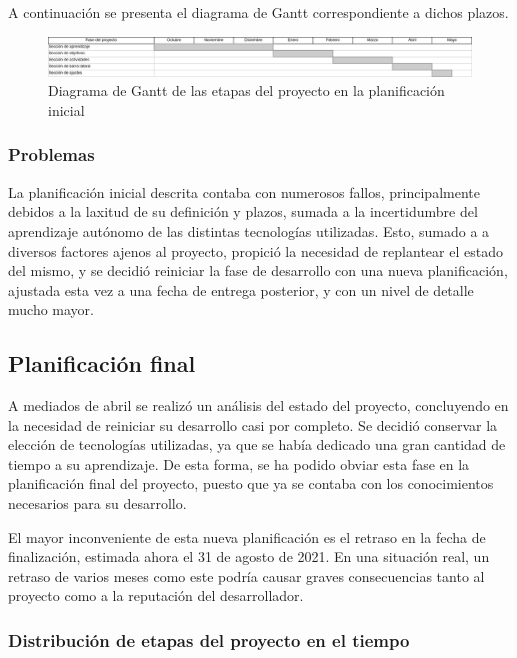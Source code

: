 \documentclass[10pt, a4paper]{aqademic}
\begin{document}
\medskip

A continuación se presenta el diagrama de Gantt correspondiente a dichos plazos. 

\begin{figure}[h]
	\centering
	\includegraphics[scale=0.35]{img/old_Gantt.png}
	\caption{Diagrama de Gantt de las etapas del proyecto en la planificación inicial}
\end{figure}

\subsubsection{Problemas}

La planificación inicial descrita contaba con numerosos fallos, principalmente debidos a la laxitud de su definición y plazos, sumada a la incertidumbre del aprendizaje autónomo de las distintas tecnologías utilizadas. Esto, sumado a a diversos factores ajenos al proyecto, propició la necesidad de replantear el estado del mismo, y se decidió reiniciar la fase de desarrollo con una nueva planificación, ajustada esta vez a una fecha de entrega posterior, y con un nivel de detalle mucho mayor.

\subsection{Planificación final}

A mediados de abril se realizó un análisis del estado del proyecto, concluyendo en la necesidad de reiniciar su desarrollo casi por completo. Se decidió conservar la elección de tecnologías utilizadas, ya que se había dedicado una gran cantidad de tiempo a su aprendizaje. De esta forma, se ha podido obviar esta fase en la planificación final del proyecto, puesto que ya se contaba con los conocimientos necesarios para su desarrollo.

El mayor inconveniente de esta nueva planificación es el retraso en la fecha de finalización, estimada ahora el 31 de agosto de 2021. En una situación real, un retraso de varios meses como este podría causar graves consecuencias tanto al proyecto como a la reputación del desarrollador.

\subsubsection*{Distribución de etapas del proyecto en el tiempo}
\end{document}
